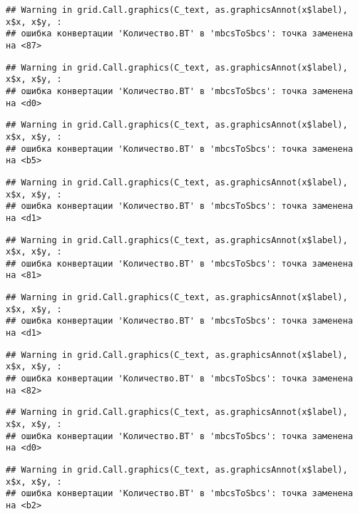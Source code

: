 \documentclass[
]{article}
\begin{document}
\begin{verbatim}
## Warning in grid.Call.graphics(C_text, as.graphicsAnnot(x$label), x$x, x$y, :
## ошибка конвертации 'Количество.ВТ' в 'mbcsToSbcs': точка заменена на <87>
\end{verbatim}

\begin{verbatim}
## Warning in grid.Call.graphics(C_text, as.graphicsAnnot(x$label), x$x, x$y, :
## ошибка конвертации 'Количество.ВТ' в 'mbcsToSbcs': точка заменена на <d0>
\end{verbatim}

\begin{verbatim}
## Warning in grid.Call.graphics(C_text, as.graphicsAnnot(x$label), x$x, x$y, :
## ошибка конвертации 'Количество.ВТ' в 'mbcsToSbcs': точка заменена на <b5>
\end{verbatim}

\begin{verbatim}
## Warning in grid.Call.graphics(C_text, as.graphicsAnnot(x$label), x$x, x$y, :
## ошибка конвертации 'Количество.ВТ' в 'mbcsToSbcs': точка заменена на <d1>
\end{verbatim}

\begin{verbatim}
## Warning in grid.Call.graphics(C_text, as.graphicsAnnot(x$label), x$x, x$y, :
## ошибка конвертации 'Количество.ВТ' в 'mbcsToSbcs': точка заменена на <81>
\end{verbatim}

\begin{verbatim}
## Warning in grid.Call.graphics(C_text, as.graphicsAnnot(x$label), x$x, x$y, :
## ошибка конвертации 'Количество.ВТ' в 'mbcsToSbcs': точка заменена на <d1>
\end{verbatim}

\begin{verbatim}
## Warning in grid.Call.graphics(C_text, as.graphicsAnnot(x$label), x$x, x$y, :
## ошибка конвертации 'Количество.ВТ' в 'mbcsToSbcs': точка заменена на <82>
\end{verbatim}

\begin{verbatim}
## Warning in grid.Call.graphics(C_text, as.graphicsAnnot(x$label), x$x, x$y, :
## ошибка конвертации 'Количество.ВТ' в 'mbcsToSbcs': точка заменена на <d0>
\end{verbatim}

\begin{verbatim}
## Warning in grid.Call.graphics(C_text, as.graphicsAnnot(x$label), x$x, x$y, :
## ошибка конвертации 'Количество.ВТ' в 'mbcsToSbcs': точка заменена на <b2>
\end{verbatim}
\end{document}
